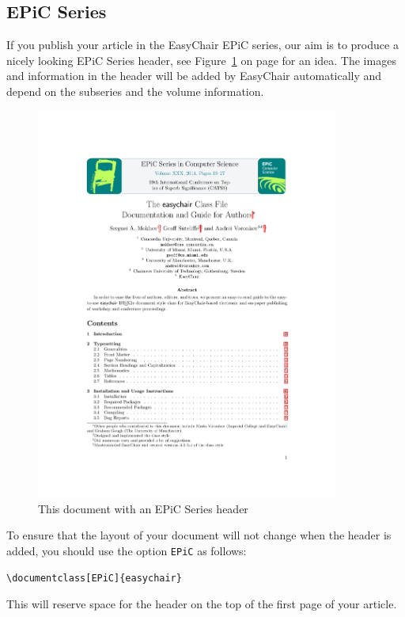 \documentclass{easychair}
\begin{document}
\subsection{EPiC Series}

If you publish your article in the EasyChair EPiC series, our aim is to produce
a nicely looking EPiC Series header, see Figure~\ref{fig:epicheader} on page
\pageref{fig:epicheader} for an idea. The images and information in the header
will be added by EasyChair automatically and depend on the subseries and the
volume information.

\begin{figure}
  \begin{centering}
    \includegraphics[width=0.89\textwidth]{epic.pdf}
    \caption{This document with an EPiC Series header} 
    \label{fig:epicheader}
  \end{centering}
\end{figure}

To ensure that the layout of your document will not change when the header is
added, you should use the option \texttt{EPiC} as follows:

\small
\begin{verbatim}
\documentclass[EPiC]{easychair}
\end{verbatim}
\normalsize
This will reserve space for the header on the top of the first page of your
article. 
\end{document}
